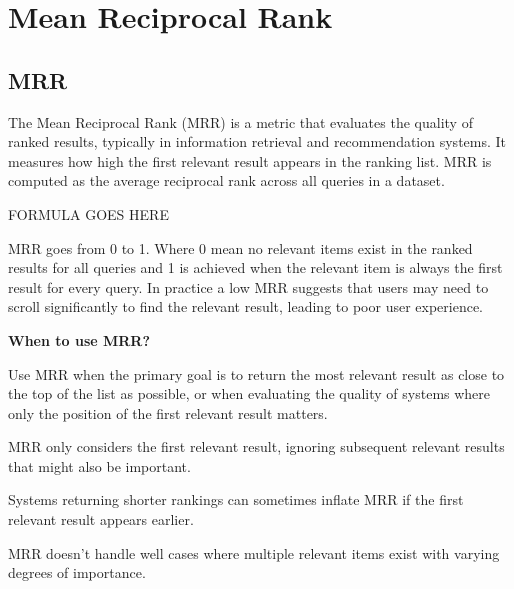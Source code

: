 \clearpage
\thispagestyle{rankingstyle}
\section{Mean Reciprocal Rank}
\subsection{MRR}

The Mean Reciprocal Rank (MRR) is a metric that evaluates the quality of ranked results, typically in information retrieval
and recommendation systems. It measures how high the first relevant result appears in the ranking list. MRR is computed as
the average reciprocal rank across all queries in a dataset.

\begin{center}
    FORMULA GOES HERE
\end{center}

MRR goes from 0 to 1. Where 0 mean no relevant items exist in the ranked results for all queries and 1 is achieved when the
relevant item is always the first result for every query. In practice a low MRR suggests that users may need to scroll
significantly to find the relevant result, leading to poor user experience.

\textbf{When to use MRR?}

Use MRR when the primary goal is to return the most relevant result as close to the top of the list as possible, or
when evaluating the quality of systems where only the position of the first relevant result matters.

{
    \item MRR only considers the first relevant result, ignoring subsequent relevant results that might also be important.
    \item Systems returning shorter rankings can sometimes inflate MRR if the first relevant result appears earlier.
    \item MRR doesn't handle well cases where multiple relevant items exist with varying degrees of importance.

}

\clearpage

\thispagestyle{customstyle}

